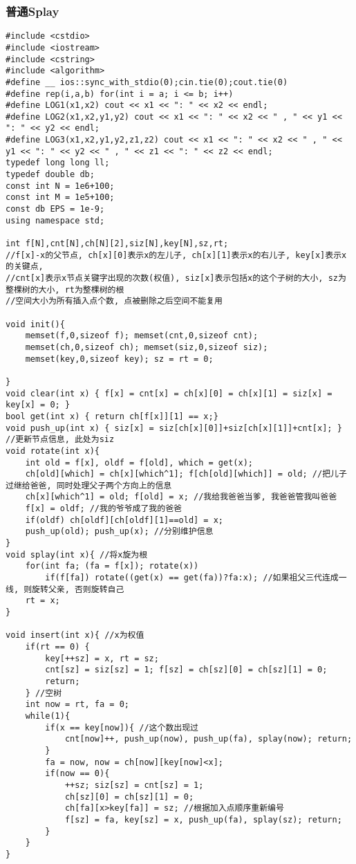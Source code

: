 \documentclass[twoside]{article}
\begin{document}
\subsubsection{普通Splay}
\begin{lstlisting}
#include <cstdio>
#include <iostream>
#include <cstring>
#include <algorithm>
#define __ ios::sync_with_stdio(0);cin.tie(0);cout.tie(0)
#define rep(i,a,b) for(int i = a; i <= b; i++)
#define LOG1(x1,x2) cout << x1 << ": " << x2 << endl;
#define LOG2(x1,x2,y1,y2) cout << x1 << ": " << x2 << " , " << y1 << ": " << y2 << endl;
#define LOG3(x1,x2,y1,y2,z1,z2) cout << x1 << ": " << x2 << " , " << y1 << ": " << y2 << " , " << z1 << ": " << z2 << endl;
typedef long long ll;
typedef double db;
const int N = 1e6+100;
const int M = 1e5+100;
const db EPS = 1e-9;
using namespace std;

int f[N],cnt[N],ch[N][2],siz[N],key[N],sz,rt;
//f[x]-x的父节点, ch[x][0]表示x的左儿子, ch[x][1]表示x的右儿子, key[x]表示x的关键点,
//cnt[x]表示x节点关键字出现的次数(权值), siz[x]表示包括x的这个子树的大小, sz为整棵树的大小, rt为整棵树的根
//空间大小为所有插入点个数, 点被删除之后空间不能复用

void init(){
	memset(f,0,sizeof f); memset(cnt,0,sizeof cnt);
	memset(ch,0,sizeof ch); memset(siz,0,sizeof siz);
	memset(key,0,sizeof key); sz = rt = 0;

}
void clear(int x) { f[x] = cnt[x] = ch[x][0] = ch[x][1] = siz[x] = key[x] = 0; }
bool get(int x) { return ch[f[x]][1] == x;}
void push_up(int x) { siz[x] = siz[ch[x][0]]+siz[ch[x][1]]+cnt[x]; } //更新节点信息, 此处为siz
void rotate(int x){
	int old = f[x], oldf = f[old], which = get(x);
	ch[old][which] = ch[x][which^1]; f[ch[old][which]] = old; //把儿子过继给爸爸, 同时处理父子两个方向上的信息
	ch[x][which^1] = old; f[old] = x; //我给我爸爸当爹, 我爸爸管我叫爸爸
	f[x] = oldf; //我的爷爷成了我的爸爸
	if(oldf) ch[oldf][ch[oldf][1]==old] = x;
	push_up(old); push_up(x); //分别维护信息
}
void splay(int x){ //将x旋为根
	for(int fa; (fa = f[x]); rotate(x))
		if(f[fa]) rotate((get(x) == get(fa))?fa:x); //如果祖父三代连成一线, 则旋转父亲, 否则旋转自己
	rt = x;
}

void insert(int x){ //x为权值
	if(rt == 0) {
		key[++sz] = x, rt = sz;
		cnt[sz] = siz[sz] = 1; f[sz] = ch[sz][0] = ch[sz][1] = 0;
		return;
	} //空树
	int now = rt, fa = 0;
	while(1){
		if(x == key[now]){ //这个数出现过
			cnt[now]++, push_up(now), push_up(fa), splay(now); return;
		}
		fa = now, now = ch[now][key[now]<x];
		if(now == 0){
			++sz; siz[sz] = cnt[sz] = 1;
			ch[sz][0] = ch[sz][1] = 0;
			ch[fa][x>key[fa]] = sz; //根据加入点顺序重新编号
			f[sz] = fa, key[sz] = x, push_up(fa), splay(sz); return;
		}
	}
}


\end{lstlisting}
\end{document}
